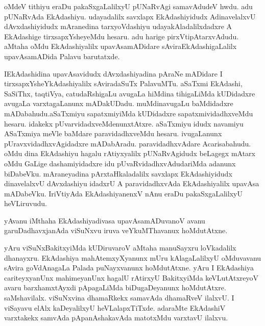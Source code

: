 \documentclass{article}
\begin{document}
\begin{mn}%
oMdeV tithiyu eraDu pakaSxgaLalilxyU pUNaRvAgi samavAdudeV hwdu. adu pUNaRvAda EkAdashiyu. 
udayadalilx savxlapx EkAdashiyidudx AdinavelalxvU dAvxdashiyidudx mAranedina tarxyoVdashiyu 
udayakAladalilxdadxre A EkAdashige tirxsapxYsheyeMdu hesaru. adu harige pirxVtipAtarxvAdudu. 
aMtaha oMdu EkAdashiyalilx upavAsamADidare sAviraEkAdashigaLalilx upavAsamADida Palavu barutatxde.
\end{mn}

\begin{mn}%
IEkAdashidina upavAsavidudx dAvxdashiyadina pAraNe mADidare I tirxsapxYsheYkAdashiyalilx 
sAviradaSuTx PalavuMTu. aSaTxmi EkAdashi, SaSiThx, taqtiVya, catudaRshigaLu avugaLa hiMdina 
tihigaLiMda kUDidadxre avugaLa varxtagaLanunx mADakUDadu. muMdinavugaLu baMdidadxre 
mADabahudu.aSaTxmiyu sapatxmiyiMda kUDidadxre sapatxmividadhxveMdu hesaru. idakekx 
pUvarvidadxveMdenunxtAtxre. aSaTxmiyu idudx navamiyu ASaTxmiya meVle baMdare paravidadhxveMdu 
hesaru. ivugaLanunx pUravxvidadhxvAgidadxre mADabAradu. paravidadhxvAdare Acarisabahudu. oMdu dina 
EkAdashiyu hagalu rAtiyxyalilx pUNaRvAgidudx beLagegx mAtarx oMdu GaLige dashamiyidadxre idu 
pUvaRvidadhxvAdudariMda adanunx biDabeVku. mAraneyadina pArxtaHkaladalilx savxlapx EkAdashiyidudx 
dinavelalxvU dAvxdashiyu idadxrU A paravidadhxvAda EkAdashiyalilx upavAsa mADabeVku. IriVtiyAda 
EkAdashiyanenxV nAnu eraDu pakaSxgaLalilxyU heVLiruvudu.
\end{mn}

\begin{mn}%
yAvanu iMthaha EkAdashiyadivasa upavAsamADuvanoV avanu garuDadhavxjanAda viSuNxvu iruva 
veYkuMThavanux hoMdutAtxne.
\end{mn}

\begin{mn}%
yAru viSuNxBakitxyiMda kUDiruvaroV aMtaha manuSayxru loVkadalilx dhanayxru. EkAdashiya 
mahAtemxyXyanunx mUru kAlagaLalilxyU oMduvavanu sAvira goVdAnagaLa Palada puNayxvanunx 
hoMdutAtxne. yAru I EkAdashiya cariteyxyanUnx mahimeyanUnx hagalU rAtirxyU BakitxyiMda 
keVLutAtxreyoV avaru barxhamxtAyxdi pApagaLiMda biDugaDeyanunx hoMdutAtxre. saMshavilalx. 
viSuNxvina dhamaRkekx samavAda dhamaRveV ilalxvU. I viSayavu elAlx kaDeyalilxyU heVLalapxTiTxde. 
adaraMte EkAdashiV varxtakekx samvAda pApanAshakavAda matotxMdu varxtavU ilalxvu.
\end{mn}

\end{document}
